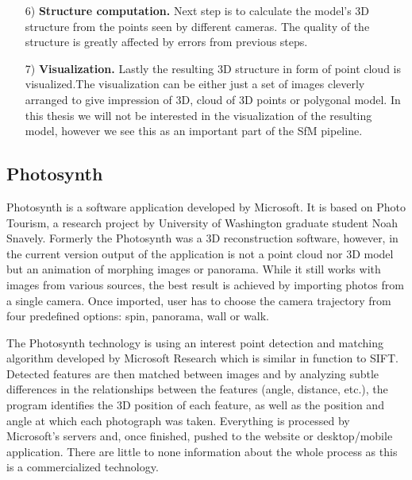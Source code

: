 \begin{itemize}
	\item[6)] \textbf{Structure computation.} Next step is to calculate the model's 3D structure from the points seen by different cameras. The quality of the structure is greatly affected by errors from previous steps.
	\item[7)] \textbf{Visualization.} Lastly the resulting 3D structure in form of point cloud is visualized.The visualization can be either just a set of images cleverly arranged to give impression of 3D, cloud of 3D points or polygonal model. In this thesis we will not be interested in the visualization of the resulting model, however we see this as an important part of the SfM pipeline.
\end{itemize}

\subsection*{Photosynth}
Photosynth is a software application developed by Microsoft. It is based on Photo Tourism, a research project by University of Washington graduate student Noah Snavely. Formerly the Photosynth was a 3D reconstruction software, however, in the current version output of the application is not a point cloud nor 3D model but an animation of morphing images or panorama. While it still works with images from various sources, the best result is achieved by importing photos from a single camera. Once imported, user has to choose the camera trajectory from four predefined options: spin, panorama, wall or walk. 

The Photosynth technology is using an interest point detection and matching algorithm developed by Microsoft Research which is similar in function to SIFT. Detected features are then matched between images and by analyzing subtle differences in the relationships between the features (angle, distance, etc.), the program identifies the 3D position of each feature, as well as the position and angle at which each photograph was taken. Everything is processed by Microsoft's servers and, once finished, pushed to the website or desktop/mobile application. There are little to none information about the whole process as this is a commercialized technology. \cite{www:photosynth}

